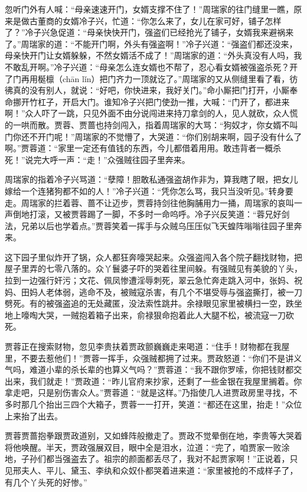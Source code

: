 \documentclass[12pt,oneside]{book}
\begin{document}
忽听门外有人喊：“母亲速速开门，女婿支撑不住了！”周瑞家的往门缝里一瞧，原来是做古董商的女婿冷子兴，忙道：“你怎么来了，女儿在家可好，铺子怎样了？”冷子兴急促道：“母亲快快开门，强盗们已经抢光了铺子，女婿我来避祸来了。”周瑞家的道：“不能开门啊，外头有强盗啊！”冷子兴道：“强盗们都还没来，母亲快开门让女婿躲躲，不然女婿活不成了！”周瑞家的道：“外头真没有人吗，我不敢乱开啊。”冷子兴道：“母亲怎么连女婿也不帮了，忍心看女婿被强盗杀死？开了门再用梴檩（chān lǐn）把门齐力一顶就讫了。”周瑞家的又从侧缝里看了看，彷彿真的没有别人，就说：“好吧，你快进来，我好关门。”命小厮把门打开，小厮奉命挪开竹杠子，开启大门。谁知冷子兴把门使劲一推，大喊：“门开了，都进来啊！”众人吓了一跳，只见外面不由分说闯进来持刀拿剑的人，见人就砍，众人慌的一哄而散。贾蓉、贾蔷也持剑闯入，指着周瑞家的大骂：“狗奴才，你女婿不叫门你还不开门呢！”周瑞家的不觉懵了，大哭道：“你们别胡来啊，园子没有什么了啊。”贾蓉道：“家里一定还有值钱的东西，今儿都借着用用。敢违背者一概杀死！”说完大呼一声：“走！”众强贼往园子里奔来。

周瑞家的指着冷子兴骂道：“孽障！胆敢私通强盗胡作非为，算我瞎了眼，把女儿嫁给一个连猪狗都不如的人！”冷子兴道：“凭你怎么骂，我只当没听见。”转身要走。周瑞家的拦着蓉、蔷不让迈步，贾蓉持剑往他胸脯用力一捅，周瑞家的哀叫一声倒地打滚，又被贾蓉踢了一脚，不多时一命呜呼。冷子兴反笑道：“蓉兄好剑法，兄弟以后也学着点。”贾蓉笑着一挥手与众贼乌压压似飞天蝗阵嗡嗡往园子里奔来。

这下园子里似炸开了锅，众人都狂奔嚎哭起来。众强盗闯入各个院子翻找财物，把屋子里弄的七零八落的。众丫鬟婆子吓的哭着往里间躲。有强贼见有美貌的丫头，拉到一边强行奸污；文花、佩凤惨遭淫辱刺死，翠云急忙奔走跳入河中，张妈、祝妈、田妈人老体弱，逃命不及，被贼寇杀害，有几个不堪受辱与强盗撕打，被一刀劈死。有的被强盗追的无处藏匿，没法索性跳井。余禄眼见家里被横扫一空，跌坐地上嚎啕大哭，一贼抱着箱子出来，俞禄狠命抱着此人大腿不松，被流寇一刀砍死。

贾蓉正在搜索财物，忽见李贵扶着贾政颤巍巍走来喝道：“住手！财物都在我屋里，不要去惹他们！”贾蓉一挥手，众强贼都拥了过来。贾政怒道：“你们不是讲义气吗，难道小辈的杀长辈的也算义气吗？”贾蓉道：“我不跟你罗嗦，你把钱财都交出来，我们就走！”贾政道：“昨儿官府来抄家，还剩了一些金银在我屋里搁着。你拿走吧，只是别伤害众人。”贾蓉道：“就是这样。”乃指使几人进贾政房里寻找，不多时那几个抬出三四个大箱子，贾蓉一一打开，笑道：“都还在这里，抬走！”众位上来抬了出去。

贾蓉贾蔷抱拳跟贾政道别，又如蜂阵般撤走了。贾政不觉晕倒在地，李贵等大哭着将他唤醒。半天，贾政强展双目，眼中全是泪水，泣道：“完了，咱贾家一败涂地，子孙们都当强盗去了。祖宗的颜面都丢尽了，我对不起贾家啊！”正说着，只见邢夫人、平儿、黛玉、李纨和众奴仆都哭着进来道：“家里被抢的不成样子了，有几个丫头死的好惨。”
\end{document}

